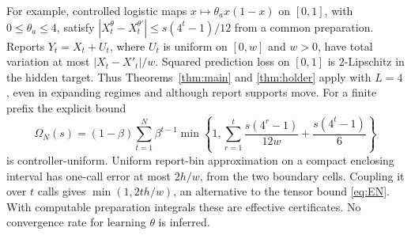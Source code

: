 For example, controlled logistic maps $x\mapsto\theta_a x(1-x)$ on $[0,1]$, with $0\le\theta_a\le4$, satisfy
$|X_t^\theta-X_t^{\theta'}|\le s(4^t-1)/12$ from a common preparation. Reports $Y_t=X_t+U_t$, where $U_t$ is uniform on $[0,w]$ and $w>0$, have total variation at most $|X_t-X'_t|/w$. Squared prediction loss on $[0,1]$ is $2$-Lipschitz in the hidden target. Thus Theorems~\ref{thm:main} and \ref{thm:holder} apply with $L=4$, even in expanding regimes and although report supports move. For a finite prefix the explicit bound
\[
 \Omega_N(s)=(1-\beta)\sum_{t=1}^N\beta^{t-1}
       \min\left\{1,\sum_{r=1}^t\frac{s(4^r-1)}{12w}
                           +\frac{s(4^t-1)}6\right\}
\]
is controller-uniform. Uniform report-bin approximation on a compact enclosing interval has one-call error at most $2h/w$, from the two boundary cells. Coupling it over $t$ calls gives $\min(1,2th/w)$, an alternative to the tensor bound \eqref{eq:EN}. With computable preparation integrals these are effective certificates. No convergence rate for learning $\theta$ is inferred.

